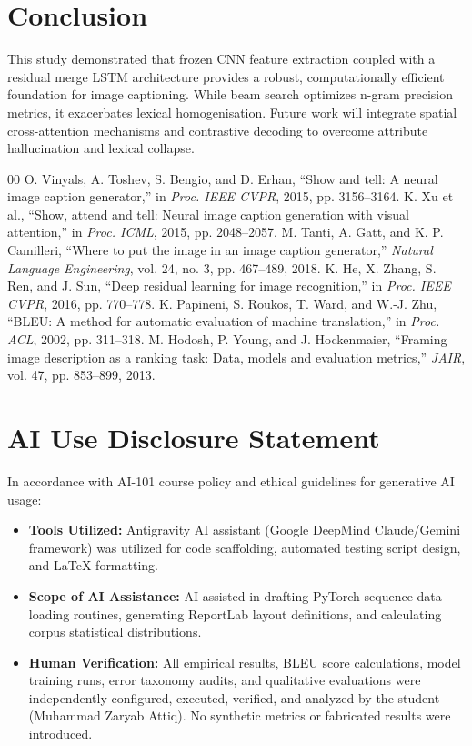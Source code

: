 \documentclass[conference]{IEEEtran}
\begin{document}
\section{Conclusion}
This study demonstrated that frozen CNN feature extraction coupled with a residual merge LSTM architecture provides a robust, computationally efficient foundation for image captioning. While beam search optimizes n-gram precision metrics, it exacerbates lexical homogenisation. Future work will integrate spatial cross-attention mechanisms and contrastive decoding to overcome attribute hallucination and lexical collapse.

\begin{thebibliography}{00}
 O. Vinyals, A. Toshev, S. Bengio, and D. Erhan, ``Show and tell: A neural image caption generator,'' in \textit{Proc. IEEE CVPR}, 2015, pp. 3156--3164.
 K. Xu et al., ``Show, attend and tell: Neural image caption generation with visual attention,'' in \textit{Proc. ICML}, 2015, pp. 2048--2057.
 M. Tanti, A. Gatt, and K. P. Camilleri, ``Where to put the image in an image caption generator,'' \textit{Natural Language Engineering}, vol. 24, no. 3, pp. 467--489, 2018.
 K. He, X. Zhang, S. Ren, and J. Sun, ``Deep residual learning for image recognition,'' in \textit{Proc. IEEE CVPR}, 2016, pp. 770--778.
 K. Papineni, S. Roukos, T. Ward, and W.-J. Zhu, ``BLEU: A method for automatic evaluation of machine translation,'' in \textit{Proc. ACL}, 2002, pp. 311--318.
 M. Hodosh, P. Young, and J. Hockenmaier, ``Framing image description as a ranking task: Data, models and evaluation metrics,'' \textit{JAIR}, vol. 47, pp. 853--899, 2013.
\end{thebibliography}

\vspace{12pt}
\section*{AI Use Disclosure Statement}
In accordance with AI-101 course policy and ethical guidelines for generative AI usage:
\begin{itemize}
    \item \textbf{Tools Utilized:} Antigravity AI assistant (Google DeepMind Claude/Gemini framework) was utilized for code scaffolding, automated testing script design, and LaTeX formatting.
    \item \textbf{Scope of AI Assistance:} AI assisted in drafting PyTorch sequence data loading routines, generating ReportLab layout definitions, and calculating corpus statistical distributions.
    \item \textbf{Human Verification:} All empirical results, BLEU score calculations, model training runs, error taxonomy audits, and qualitative evaluations were independently configured, executed, verified, and analyzed by the student (Muhammad Zaryab Attiq). No synthetic metrics or fabricated results were introduced.
\end{itemize}
\end{document}
